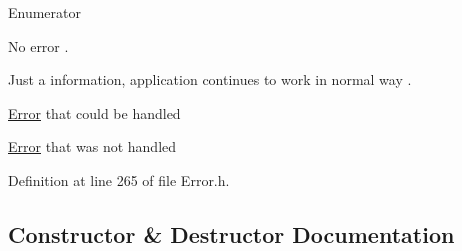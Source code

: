 \begin{Desc}
\item[Enumerator]\par
\begin{description}
\item[{\em 
No\+Error\hypertarget{class_mdt_1_1_error_ab533dc690f68a8635232db594194a068a1f0076cc77af5bed268bcef0c88969de}{}\label{class_mdt_1_1_error_ab533dc690f68a8635232db594194a068a1f0076cc77af5bed268bcef0c88969de}
}]No error . \item[{\em 
Info\hypertarget{class_mdt_1_1_error_ab533dc690f68a8635232db594194a068a6cf5d2017767cf4086ebb2d245d42f11}{}\label{class_mdt_1_1_error_ab533dc690f68a8635232db594194a068a6cf5d2017767cf4086ebb2d245d42f11}
}]Just a information, application continues to work in normal way . \item[{\em 
Warning\hypertarget{class_mdt_1_1_error_ab533dc690f68a8635232db594194a068a6b9dbb52e31678b806f4ecf1ae23d2ab}{}\label{class_mdt_1_1_error_ab533dc690f68a8635232db594194a068a6b9dbb52e31678b806f4ecf1ae23d2ab}
}]\hyperlink{class_mdt_1_1_error}{Error} that could be handled \item[{\em 
Critical\hypertarget{class_mdt_1_1_error_ab533dc690f68a8635232db594194a068a6d4d123a2a43721c206c455a721567b6}{}\label{class_mdt_1_1_error_ab533dc690f68a8635232db594194a068a6d4d123a2a43721c206c455a721567b6}
}]\hyperlink{class_mdt_1_1_error}{Error} that was not handled \end{description}
\end{Desc}


Definition at line 265 of file Error.\+h.



\subsection{Constructor \& Destructor Documentation}
